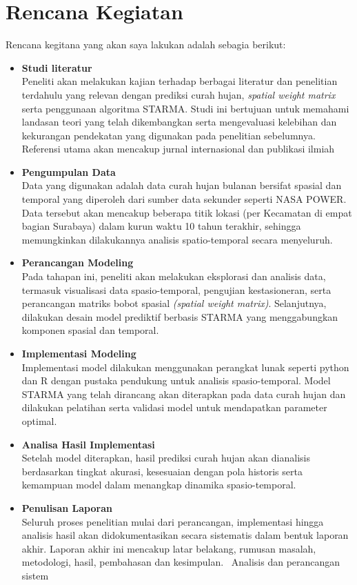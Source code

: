 \section{Rencana Kegiatan}
Rencana kegitana yang akan saya lakukan adalah sebagia berikut:
\begin{itemize}
    \item \textbf {Studi literatur} \\ Peneliti akan melakukan kajian terhadap berbagai literatur dan penelitian terdahulu yang relevan dengan prediksi curah hujan,  \textit{spatial weight matrix} serta penggunaan algoritma STARMA. Studi ini bertujuan untuk memahami landasan teori yang telah dikembangkan serta mengevaluasi kelebihan dan kekurangan pendekatan yang digunakan pada penelitian sebelumnya. Referensi utama akan mencakup jurnal internasional dan publikasi ilmiah
    \item \textbf {Pengumpulan Data} \\ Data yang digunakan adalah data curah hujan bulanan bersifat spasial dan temporal yang diperoleh dari sumber data sekunder seperti NASA POWER. Data tersebut akan mencakup beberapa titik lokasi (per Kecamatan di empat bagian Surabaya) dalam kurun waktu 10 tahun terakhir, sehingga memungkinkan dilakukannya analisis spatio-temporal secara menyeluruh. 
    \item \textbf{Perancangan Modeling} \\ Pada tahapan ini, peneliti akan melakukan eksplorasi dan analisis data, termasuk visualisasi data spasio-temporal, pengujian kestasioneran, serta perancangan matriks bobot spasial \textit{(spatial weight matrix)}. Selanjutnya, dilakukan desain model prediktif berbasis STARMA yang menggabungkan komponen spasial dan temporal. 
    \item \textbf{Implementasi Modeling} \\ Implementasi model dilakukan menggunakan perangkat lunak seperti python dan R dengan pustaka pendukung untuk analisis spasio-temporal. Model STARMA yang telah dirancang akan diterapkan pada data curah hujan dan dilakukan pelatihan serta validasi model untuk mendapatkan parameter optimal. 
    \item \textbf{Analisa Hasil Implementasi} \\ Setelah model diterapkan, hasil prediksi curah hujan akan dianalisis berdasarkan tingkat akurasi, kesesuaian dengan pola historis serta kemampuan model dalam menangkap dinamika spasio-temporal.
    \item \textbf{Penulisan Laporan } \\ Seluruh proses penelitian mulai dari perancangan, implementasi hingga analisis hasil akan didokumentasikan secara sistematis dalam bentuk laporan akhir. Laporan akhir ini mencakup latar belakang, rumusan masalah, metodologi, hasil, pembahasan dan kesimpulan.
    \
Analisis dan perancangan sistem 
\end{itemize}